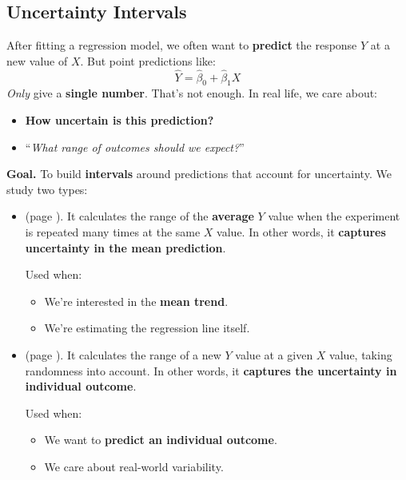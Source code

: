 \subsection{Uncertainty Intervals}

After fitting a regression model, we often want to \textbf{predict} the response $Y$ at a new value of $X$. But point predictions like:
\begin{equation*}
    \hat{Y} = \hat{\beta}_0 + \hat{\beta}_1 X
\end{equation*}
\emph{Only} give a \textbf{single number}. That's not enough. In real life, we care about:
\begin{itemize}
    \item \textbf{How uncertain is this prediction?}
    \item ``\emph{What range of outcomes should we expect?}''
\end{itemize}
\textcolor{Green3}{ \textbf{Goal.}} To build \textbf{intervals} around predictions that account for uncertainty. We study two types:
\begin{itemize}
    \item {} (page \pageref{subsubsection: Confidence Interval for the Mean Response}). It calculates the range of the \textbf{average} $Y$ value when the experiment is repeated many times at the same $X$ value. In other words, it \textbf{captures uncertainty in the mean prediction}.

    Used when:
    \begin{itemize}
        \item We're interested in the \textbf{mean trend}.
        \item We're estimating the regression line itself.
    \end{itemize}


    \item {} (page \pageref{subsubsection: Prediction Interval for a New Observation}). It calculates the range of a new $Y$ value at a given $X$ value, taking randomness into account. In other words, it \textbf{captures the uncertainty in individual outcome}.
    
    Used when:
    \begin{itemize}
        \item We want to \textbf{predict an individual outcome}.
        \item We care about real-world variability.
    \end{itemize}
\end{itemize}

